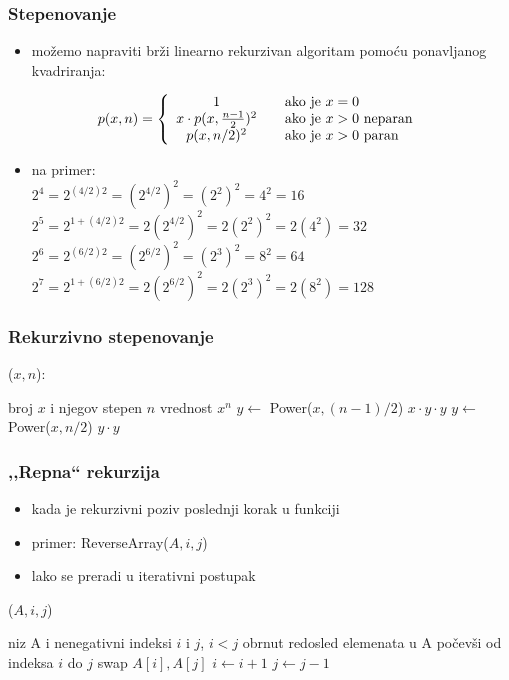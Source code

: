 \documentclass[compress,aspectratio=169]{beamer}
\begin{document}
\begin{frame}[fragile]
  \frametitle{Stepenovanje}
  \begin{itemize}
    \item možemo napraviti brži linearno rekurzivan algoritam pomoću ponavljanog kvadriranja:
  \end{itemize}
  $$ p(x,n) = \left\{ \begin{array}{c l} 1 & \quad \text{ako je } x=0 \\x\cdot p(x, \frac{n-1}{2})^2 & \quad \text{ako je } x>0 \text{ neparan}\\p(x,n/2)^2 & \quad \text{ako je } x>0 \text{ paran} \end{array}\right. $$
  \begin{itemize}
    \item na primer: \\
    $ 2^4 = 2^{(4/2)2} = (2^{4/2})^2 = (2^2)^2 = 4^2 = 16 $ \\
    $ 2^5 = 2^{1+(4/2)2} = 2(2^{4/2})^2 = 2(2^2)^2 = 2(4^2) = 32 $ \\
    $ 2^6 = 2^{(6/2)2} = (2^{6/2})^2 = (2^3)^2 = 8^2 = 64 $ \\
    $ 2^7 = 2^{1+(6/2)2} = 2(2^{6/2})^2 = 2(2^3)^2 = 2(8^2) = 128$
  \end{itemize}
\end{frame}

\begin{frame}[fragile]
  \frametitle{Rekurzivno stepenovanje}
($x, n$):
\begin{algorithmic}
\REQUIRE broj $x$ i njegov stepen $n$
\ENSURE vrednost $x^n$
\ENDIF
{}
  \STATE $y \leftarrow$ Power($x, (n-1)/2$) 
  \RETURN $x\cdot y\cdot y$
\ELSE
  \STATE $y \leftarrow$ Power($x, n/2$)
  \RETURN $y\cdot y$  
\ENDIF  
\end{algorithmic}
\end{frame}

\begin{frame}[fragile]
  \frametitle{,,Repna`` rekurzija}
  \begin{itemize}
    \item kada je rekurzivni poziv poslednji korak u funkciji
    \item primer: ReverseArray($A, i, j$)
    \item lako se preradi u iterativni postupak
  \end{itemize}
($A, i, j$)
\begin{algorithmic}
\REQUIRE niz A i nenegativni indeksi $i$ i $j$, $i<j$
\ENSURE obrnut redosled elemenata u A počevši od indeksa $i$ do $j$
  \STATE swap $A[i], A[j]$
  \STATE $i \leftarrow i + 1$
  \STATE $j \leftarrow j - 1$
\ENDWHILE
\end{algorithmic}
\end{frame}
\end{document}
